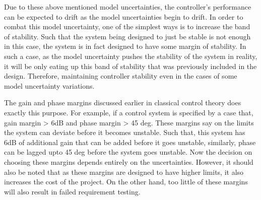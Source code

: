 Due to these above mentioned model uncertainties, the controller's performance can be expected to drift as the model uncertainties begin to drift. In order to combat this model uncertainty, one of the simplest ways is to increase the band of stability. Such that the system being designed to just be stable is not enough in this case, the system is in fact designed to have some margin of stability. In such a case, as the model uncertainty pushes the stability of the system in reality, it will be only eating up this band of stability that was previously included in the design. Therefore, maintaining controller stability even in the cases of some model uncertainty variations.

The gain and phase margins discussed earlier in classical control theory does exactly this purpose. For example, if a control system is specified by a case that, gain margin > 6dB and phase margin > 45 deg. These margins say on the limits the system can deviate before  it becomes unstable. Such that, this system has 6dB of additional gain that can be added before it goes unstable, similarly, phase can be lagged upto 45 deg before the system goes unstable. Now the decision on choosing these margins depends entirely on the uncertainties. However, it should also be noted that as these margins are designed to have higher limits, it also increases the cost of the project. On the other hand, too little of these margins will also result in failed requirement testing.

